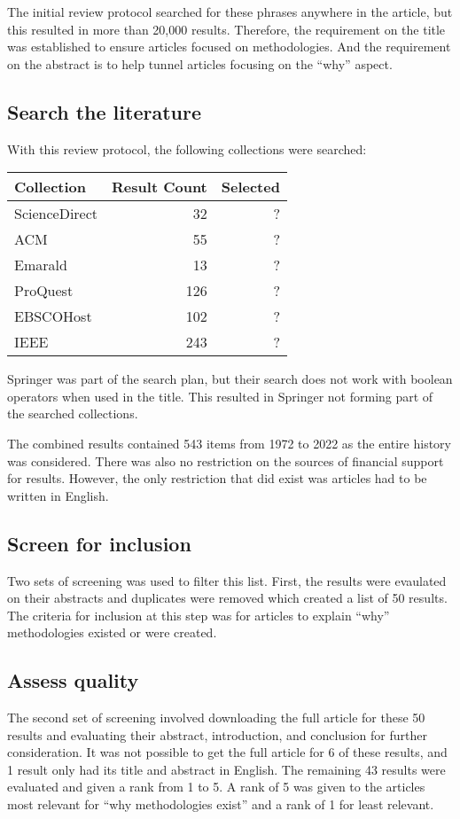 The initial review protocol searched for these phrases anywhere in the article, but this resulted in more than 20,000 results.
Therefore, the requirement on the title was established to ensure articles focused on methodologies.
And the requirement on the abstract is to help tunnel articles focusing on the ``why'' aspect.

\subsection{Search the literature}
With this review protocol, the following collections were searched:

\begin{table}[H]
\begin{tabular}{ |l|r|r| }
  \hline
  Collection & Result Count & Selected \\
  \hline
  ScienceDirect & 32 & ? \\
  ACM & 55 & ? \\
  Emarald & 13 & ? \\
  ProQuest & 126 & ? \\
  EBSCOHost & 102 & ? \\
  IEEE & 243 & ? \\
  \hline
\end{tabular}
\label{table:search_lit}
\end{table}

Springer was part of the search plan, but their search does not work with boolean operators when used in the title.
This resulted in Springer not forming part of the searched collections.

The combined results contained 543  items from 1972 to 2022 as the entire history was considered.
There was also no restriction on the sources of financial support for results.
However, the only restriction that did exist was articles had to be written in English.

\subsection{Screen for inclusion}
Two sets of screening was used to filter this list.
First, the results were evaulated on their abstracts and duplicates were removed which created a list of 50 results.
The criteria for inclusion at this step was for articles to explain ``why'' methodologies existed or were created.

\subsection{Assess quality}
The second set of screening involved downloading the full article for these 50 results and evaluating their abstract, introduction, and conclusion for further consideration.
It was not possible to get the full article for 6 of these results, and 1 result only had its title and abstract in English.
The remaining 43 results were evaluated and given a rank from 1 to 5.
A rank of 5 was given to the articles most relevant for ``why methodologies exist'' and a rank of 1 for least relevant.

